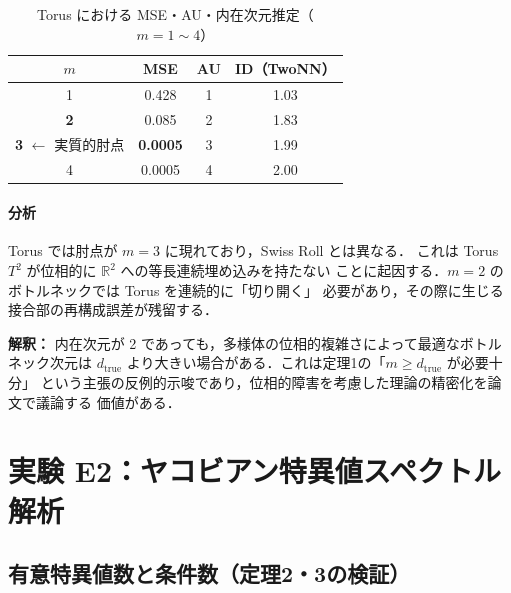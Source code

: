 \documentclass[12pt,a4paper]{ltjsarticle}  %
\newcommand{\dtrue}{d_{\mathrm{true}}}
\begin{document}
\begin{table}[H]
  \centering
  \caption{Torus における MSE・AU・内在次元推定（$m = 1 \sim 4$）}
  \label{tab:e1_torus}
  \renewcommand{\arraystretch}{1.2}
  \begin{tabular}{cccc}
    \toprule
    $m$ & MSE & AU & ID（TwoNN）\\
    \midrule
    1                                    & 0.428  & 1 & 1.03 \\
    \textbf{2}                           & 0.085  & 2 & 1.83 \\
    \textbf{3} $\leftarrow$ 実質的肘点   & \textbf{0.0005} & 3 & 1.99 \\
    4                                    & 0.0005 & 4 & 2.00 \\
    \bottomrule
  \end{tabular}
\end{table}


\paragraph{分析}
Torus では肘点が $m = 3$ に現れており，Swiss Roll とは異なる．
これは Torus $T^2$ が位相的に $\mathbb{R}^2$ への等長連続埋め込みを持たない
ことに起因する．$m = 2$ のボトルネックでは Torus を連続的に「切り開く」
必要があり，その際に生じる接合部の再構成誤差が残留する．

\textbf{解釈：}
内在次元が 2 であっても，多様体の位相的複雑さによって最適なボトルネック次元は
$\dtrue$ より大きい場合がある．これは定理1の「$m \geq \dtrue$ が必要十分」
という主張の反例的示唆であり，位相的障害を考慮した理論の精密化を論文で議論する
価値がある．

\section{実験 E2：ヤコビアン特異値スペクトル解析}

\subsection{有意特異値数と条件数（定理2・3の検証）}
\end{document}
